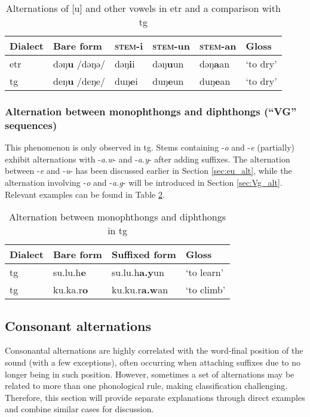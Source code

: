 \begin{table}[!htbp]
\centering
\caption{Alternations of [u] and other vowels in \acl{etr} and a comparison with \acl{tg}}
\label{tab:eu_alt_special}
\begin{tabular}{llllll}
\hline
Dialect   & Bare form & \textsc{stem}-i & \textsc{stem}-un & \textsc{stem}-an & Gloss    \\ \hline
\acl{etr} & dəŋ\textbf{u} /dəŋə/      & dəŋ\textbf{i}i   & dəŋ\textbf{u}un   & dəŋ\textbf{a}an   & `to dry' \\
\acl{tg}  & deŋ\textbf{u} /deŋe/      & duŋ\textbf{e}i   & duŋ\textbf{e}un   & duŋ\textbf{e}an   & `to dry' \\ \hline
\end{tabular}
\end{table}

\subsubsection{Alternation between monophthongs and diphthongs (``VG'' sequences)}

This phenomenon is only observed in \acl{tg}. Stems containing -\textit{o} and -\textit{e} (partially) exhibit alternations with -\textit{a.w}- and -\textit{a.y}- after adding suffixes. The alternation between -\textit{e} and -\textit{u}- has been discussed earlier in Section \ref{sec:eu_alt}, while the alternation involving -\textit{o} and -\textit{a.g}- will be introduced in Section \ref{sec:Vg_alt}. Relevant examples can be found in Table \ref{tab:oeaway_alt}.

\begin{table}[!htbp]
\centering
\caption{Alternation between monophthongs and diphthongs in \acl{tg}}
\label{tab:oeaway_alt}
\begin{tabular}{llll}
\hline
Dialect  & Bare form & Suffixed form & Gloss      \\ \hline
\acl{tg} & su.lu.h\textbf{e}  & su.lu.h\textbf{a.y}un  & `to learn' \\
\acl{tg} & ku.ka.r\textbf{o}  & ku.ku.r\textbf{a.w}an  & `to climb' \\ \hline
\end{tabular}
\end{table}

\subsection{Consonant alternations}

Consonantal alternations are highly correlated with the word-final position of the sound (with a few exceptions), often occurring when attaching suffixes due to no longer being in such position. However, sometimes a set of alternations may be related to more than one phonological rule, making classification challenging. Therefore, this section will provide separate explanations through direct examples and combine similar cases for discussion.

